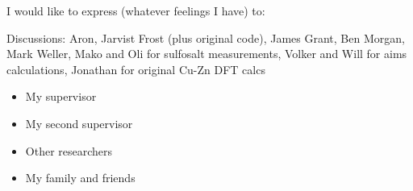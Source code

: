 
\cleardoublepage


\begin{acknowledgements}

I would like to express (whatever feelings I have) to:

Discussions: Aron, Jarvist Frost (plus original code), James Grant, Ben Morgan, Mark Weller, Mako and Oli for sulfosalt measurements, Volker and Will for aims calculations, Jonathan for original Cu-Zn DFT calcs

\begin{itemize}
 \item My supervisor
 \vspace*{3mm}
 \item My second supervisor
 \vspace*{3mm}
 \item Other researchers
 \vspace*{3mm}
 \item My family and friends
\end{itemize}

\end{acknowledgements}
